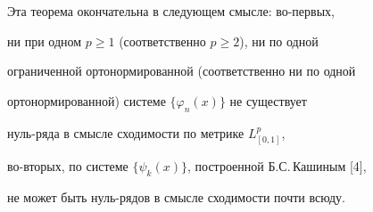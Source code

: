 




\begin{notenonum}


Эта теорема окончательна в следующем смысле: во-первых, 


ни при одном $p\geq 1$ (соответственно $p\geq 2$), ни по одной 


ограниченной ортонормированной (соответственно ни по одной 


ортонормированной) системе $\{ \varphi_n(x)\}$ не существует 


нуль-ряда в смысле сходимости по метрике $L^p_{[0,1]}$, 


во-вторых, по системе $\{ \psi_k(x)\}$, построенной Б.С.\,Кашиным [4], 


не может быть нуль-рядов в смысле сходимости почти всюду. 


\end{notenonum}





